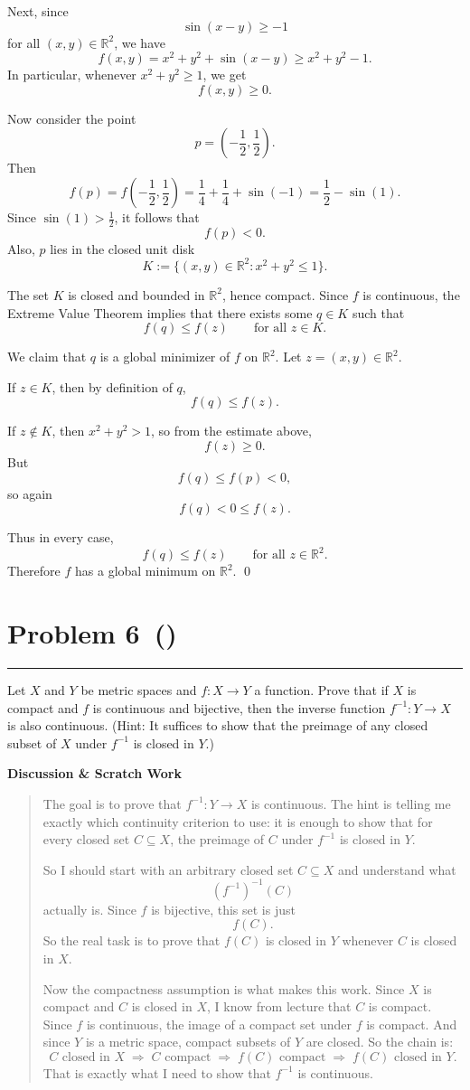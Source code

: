 \documentclass[12pt]{article}
\makeatletter
\newenvironment{scratch}{%
  \par\smallskip
  \noindent\textbf{Discussion \& Scratch Work}\begin{quote}\small
}{%
  \end{quote}\smallskip
}
\newcommand{\problem}[2][]{%
  \def\prob@title{Problem #2\if\relax\detokenize{#1}\relax\else\ (\textit{#1})\fi}%
  \phantomsection%
  \pdfbookmark[1]{\prob@title}{prob#2}%
  \addcontentsline{toc}{section}{\prob@title}%
  \section*{\prob@title}%
  \vspace{-0.25em}\hrule\vspace{0.8em}%
}
\makeatother
\begin{document}
Next, since
\[
\sin(x-y)\ge -1
\]
for all $(x,y)\in\mathbb{R}^2$, we have
\[
f(x,y)=x^2+y^2+\sin(x-y)\ge x^2+y^2-1.
\]
In particular, whenever $x^2+y^2\ge 1$, we get
\[
f(x,y)\ge 0.
\]

Now consider the point
\[
p=\left(-\frac12,\frac12\right).
\]
Then
\[
f(p)
=
f\!\left(-\frac12,\frac12\right)
=
\frac14+\frac14+\sin\!\left(-1\right)
=
\frac12-\sin(1).
\]
Since $\sin(1)>\frac12$, it follows that
\[
f(p)<0.
\]
Also, $p$ lies in the closed unit disk
\[
K:=\{(x,y)\in\mathbb{R}^2:x^2+y^2\le 1\}.
\]

The set $K$ is closed and bounded in $\mathbb{R}^2$, hence compact. Since $f$ is continuous, the Extreme Value Theorem implies that there exists some $q\in K$ such that
\[
f(q)\le f(z)\qquad \text{for all } z\in K.
\]

We claim that $q$ is a global minimizer of $f$ on $\mathbb{R}^2$. Let $z=(x,y)\in\mathbb{R}^2$.

If $z\in K$, then by definition of $q$,
\[
f(q)\le f(z).
\]

If $z\notin K$, then $x^2+y^2>1$, so from the estimate above,
\[
f(z)\ge 0.
\]
But
\[
f(q)\le f(p)<0,
\]
so again
\[
f(q)<0\le f(z).
\]

Thus in every case,
\[
f(q)\le f(z)\qquad \text{for all } z\in\mathbb{R}^2.
\]
Therefore $f$ has a global minimum on $\mathbb{R}^2$.
\qed

\newpage

\problem[]{6}
Let $X$ and $Y$ be metric spaces and $f:X\to Y$ a function. Prove that if $X$ is
compact and $f$ is continuous and bijective, then the inverse function $f^{-1}:Y\to X$ is also
continuous. (Hint: It suffices to show that the preimage of any closed subset of $X$ under $f^{-1}$
is closed in $Y$.)

\begin{scratch}
The goal is to prove that $f^{-1}:Y\to X$ is continuous. The hint is telling me exactly which continuity criterion to use: it is enough to show that for every closed set $C\subseteq X$, the preimage of $C$ under $f^{-1}$ is closed in $Y$.

So I should start with an arbitrary closed set $C\subseteq X$ and understand what
\[
(f^{-1})^{-1}(C)
\]
actually is. Since $f$ is bijective, this set is just
\[
f(C).
\]
So the real task is to prove that $f(C)$ is closed in $Y$ whenever $C$ is closed in $X$.

Now the compactness assumption is what makes this work. Since $X$ is compact and $C$ is closed in $X$, I know from lecture that $C$ is compact. Since $f$ is continuous, the image of a compact set under $f$ is compact. And since $Y$ is a metric space, compact subsets of $Y$ are closed. So the chain is:
\[
C \text{ closed in } X
\;\Longrightarrow\;
C \text{ compact}
\;\Longrightarrow\;
f(C) \text{ compact}
\;\Longrightarrow\;
f(C) \text{ closed in } Y.
\]
That is exactly what I need to show that $f^{-1}$ is continuous.
\end{scratch}
\end{document}
